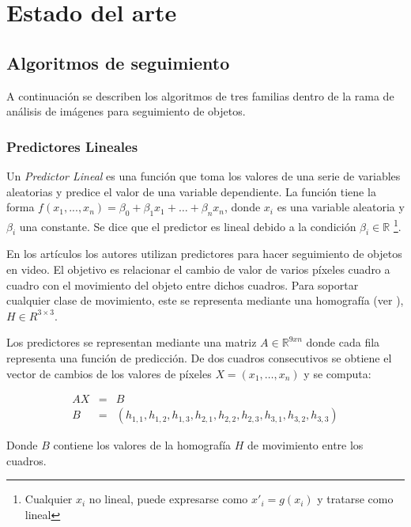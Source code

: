 \chapter{Estado del arte}
\label{chap-state}

\section{Algoritmos de seguimiento}

\label{sec:tracking}

A continuación se describen los algoritmos de tres familias dentro de la rama
de análisis de imágenes para seguimiento de objetos.

\subsection{Predictores Lineales}

Un \textit{Predictor Lineal} es una función que toma los valores de una serie
de variables aleatorias y predice el valor de una variable dependiente.  La
función tiene la forma $f(x_1, ..., x_n) = \beta_0 + \beta_1 x_1 + \dots +
\beta_n x_n$, donde $x_i$ es una variable aleatoria y $\beta_i$ una constante.
Se dice que el predictor es lineal debido a la condición $\beta_i \in \mathbb{R}$
\footnote{Cualquier $x_i$ no lineal, puede expresarse como $x'_i = g(x_i)$ y tratarse como lineal}.

En los artículos \cite{alp, original-linear-predictors} los autores utilizan
predictores para hacer seguimiento de objetos en video.  El objetivo es
relacionar el cambio de valor de varios píxeles cuadro a cuadro con el
movimiento del objeto entre dichos cuadros.  Para soportar cualquier clase de
movimiento, este se representa mediante una homografía (ver
\cite{homography-estimation}), $H \in R^{3\times3}$.

Los predictores se representan mediante una matriz $A \in \mathbb{R}^{9xn}$
donde cada fila representa una función de predicción.  De dos cuadros
consecutivos se obtiene el vector de cambios de los valores de píxeles $X = (x_1,
\dots, x_n)$ y se computa:

\begin{eqnarray*}
    AX &=& B \\
    B &=& (h_{1,1}, h_{1,2}, h_{1,3}, h_{2,1}, h_{2,2}, h_{2,3}, h_{3,1}, h_{3,2}, h_{3,3})
\end{eqnarray*}

Donde $B$ contiene los valores de la homografía $H$ de movimiento entre los cuadros.

